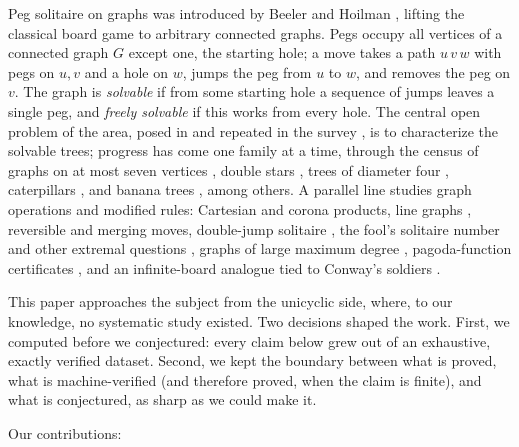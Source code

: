 \documentclass[11pt]{article}
\theoremstyle{definition}
\begin{document}
Peg solitaire on graphs was introduced by Beeler and Hoilman
\cite{BH11}, lifting the classical board game \cite{Beasley,BCG,Bell}
to arbitrary connected graphs. Pegs occupy all vertices of a
connected graph $G$ except one, the starting hole; a move takes a
path $u\,v\,w$ with pegs on $u,v$ and a hole on $w$, jumps the peg
from $u$ to $w$, and removes the peg on $v$. The graph is
\emph{solvable} if from some starting hole a sequence of jumps leaves
a single peg, and \emph{freely solvable} if this works from every
hole. The central open problem of the area, posed in \cite{BH11} and
repeated in the survey \cite{dWK23}, is to characterize the solvable
trees; progress has come one family at a time, through the census of
graphs on at most seven vertices \cite{BG12}, double stars
\cite{BH12}, trees of diameter four \cite{BW15}, caterpillars
\cite{BGH17}, and banana trees \cite{dWK20}, among others. A parallel
line studies graph operations and modified rules: Cartesian
\cite{KdWcart} and corona \cite{KdWcorona} products, line graphs
\cite{KdWline}, reversible \cite{ES} and merging \cite{EW} moves,
double-jump solitaire \cite{BGdj}, the fool's solitaire number and
other extremal questions \cite{BR12,BGext}, graphs of large maximum
degree \cite{Mat}, pagoda-function certificates \cite{Kpagoda}, and
an infinite-board analogue tied to Conway's soldiers \cite{Vito}.

This paper approaches the subject from the unicyclic side, where, to
our knowledge, no systematic study existed. Two decisions shaped the
work. First, we computed before we conjectured: every claim below
grew out of an exhaustive, exactly verified dataset. Second, we kept
the boundary between what is proved, what is machine-verified (and
therefore proved, when the claim is finite), and what is conjectured,
as sharp as we could make it.

Our contributions:
\end{document}
